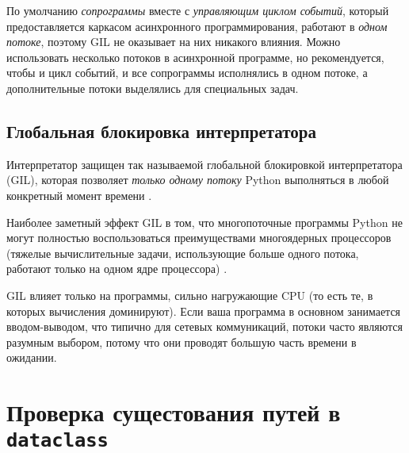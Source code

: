\documentclass[%
	11pt,
	a4paper,
	utf8,
		]{article}
\begin{document}
По умолчанию \emph{сопрограммы} вместе с \emph{управляющим циклом событий}, который предоставляется каркасом асинхронного программирования, работают в \emph{одном потоке}, поэтому GIL не оказывает на них никакого влияния. Можно использовать несколько потоков в асинхронной программе, но рекомендуется, чтобы и цикл событий, и все сопрограммы исполнялись в одном потоке, а дополнительные потоки выделялись для специальных задач.



\subsection{Глобальная блокировка интерпретатора}

Интерпретатор защищен так называемой глобальной блокировкой интерпретатора (GIL), которая позволяет \emph{только одному потоку} Python выполняться в любой конкретный момент времени \cite[]{beazley:python_cookbook-2019}.

Наиболее заметный эффект GIL в том, что многопоточные программы Python не могут полностью воспользоваться преимуществами многоядерных процессоров (тяжелые вычислительные задачи, использующие больше одного потока, работают только на одном ядре процессора) \cite[]{beazley:python_cookbook-2019}.

{\color{blue}GIL влияет только на программы, сильно нагружающие CPU} (то есть те, в которых вычисления доминируют). Если ваша программа в основном занимается вводом-выводом, что типично для сетевых коммуникаций, потоки часто являются разумным выбором, потому что они проводят большую часть времени в ожидании.

\section{Проверка сущестования путей в \texttt{dataclass}}
\end{document}
